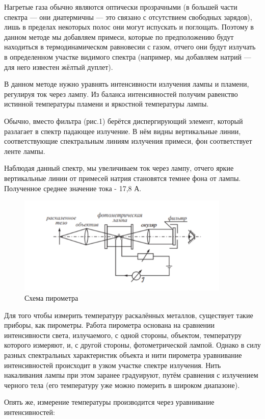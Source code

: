 \documentclass[a4paper]{article}
\begin{document}
\par
Нагретые газа обычно являются оптически прозрачными (в большей части спектра — они диатермичны — это связано с отсутствием свободных зарядов), лишь в пределах некоторых полос они могут испускать и поглощать. Поэтому в данном методе мы добавляем примеси, которые по предположению будут находиться в термодинамическом равновесии с газом, отчего они будут излучать в определенном участке видимого спектра (например, мы добавляем натрий — для него известен жёлтый дуплет). \par
В данном методе нужно уравнять интенсивности излучения лампы и пламени, регулируя ток через лампу. Из баланса интенсивностей получим равенство истинной температуры пламени и яркостной температуры лампы. \par
Обычно, вместо фильтра (рис.1) берётся диспергирующий элемент, который разлагает в спектр падающее излучение. В нём видны вертикальные линии, соответствующие спектральным линиям излучения примеси, фон соответствует ленте лампы. \par
Наблюдая данный спектр, мы увеличиваем ток через лампу, отчего яркие вертикальные линии от примесей натрия становятся темнее фона от лампы.  Полученное среднее значение тока - 17,8 А. \par



\begin {figure}[H]
\begin{center}
\par
\includegraphics[width=0.9\textwidth]{pl2.png}
\caption{Схема пирометра}
\end{center}
\end {figure}

\par
Для того чтобы измерить температуру раскалённых металлов, существует такие приборы, как пирометры. Работа пирометра основана на сравнении интенсивности света, излучаемого, с одной стороны, объектом, температуру которого измеряют, и, с другой стороны, фотометрической лампой. Однако в силу разных спектральных характеристик объекта и нити пирометра уравнивание интенсивностей происходит в узком участке спектре излучения.
Нить накаливания лампы при этом заранее градуируют, путём сравнения с излучением черного тела (его температуру уже можно померить в широком диапазоне).\par
Опять же, измерение температуры производится через уравнивание интенсивностей:
\end{document}
